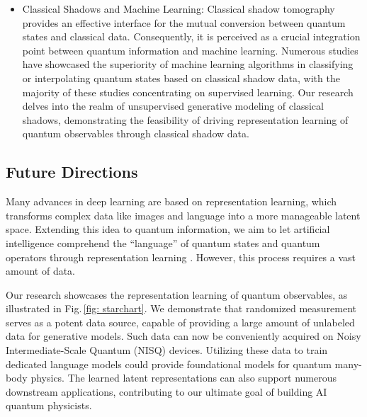 \documentclass[fleqn,11pt]{wlscirep}
\newcommand{\figref}[1]{Fig.\,\ref{#1}}
\begin{document}
\begin{itemize}
\item Classical Shadows and Machine Learning: Classical shadow tomography provides an effective interface for the mutual conversion between quantum states and classical data. Consequently, it is perceived as a crucial integration point between quantum information and machine learning. Numerous studies \cite{Li2020V2012.08288, Huang2021P2011.01938, Huang2021I2101.02464, Huang2021P2106.12627, Huang2022Q2112.00778, Van-Kirk2022H2212.06084, Wei2023N2305.01078, Jerbi2023S2306.00061} have showcased the superiority of machine learning algorithms in classifying or interpolating quantum states based on classical shadow data, with the majority of these studies concentrating on supervised learning. Our research delves into the realm of unsupervised generative modeling of classical shadows, demonstrating the feasibility of driving representation learning of quantum observables through classical shadow data.
\end{itemize}

\subsection*{Future Directions}

Many advances in deep learning are based on representation learning, which transforms complex data like images and language into a more manageable latent space. Extending this idea to quantum information, we aim to let artificial intelligence comprehend the ``language'' of quantum states and quantum operators through representation learning \cite{Iten2020D1807.10300, Poulsen-Nautrup2020O2001.00593, Frohnert2023E2306.05694}. However, this process requires a vast amount of data.

Our research showcases the representation learning of quantum observables, as illustrated in \figref{fig: starchart}. We demonstrate that randomized measurement serves as a potent data source, capable of providing a large amount of unlabeled data for generative models. Such data can now be conveniently acquired on Noisy Intermediate-Scale Quantum (NISQ)\cite{Preskill2018Q1801.00862} devices. Utilizing these data to train dedicated language models could provide foundational models for quantum many-body physics. The learned latent representations can also support numerous downstream applications, contributing to our ultimate goal of building AI quantum physicists.
\end{document}
